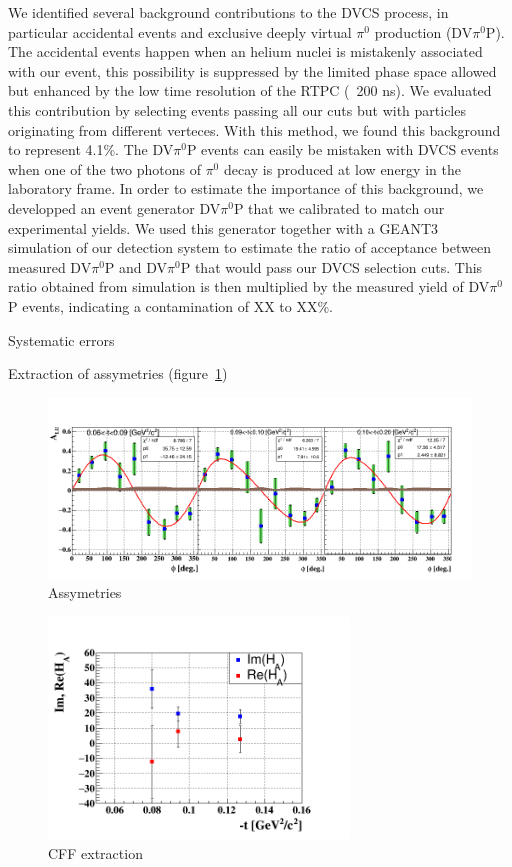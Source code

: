 \documentclass[%
 reprint,
 amsmath,amssymb,
 aps,
]{revtex4-1}
\begin{document}
We identified several background contributions to the DVCS process, in 
particular accidental events and exclusive deeply virtual $\pi^0$ production (DV$\pi^0$P). The accidental
events happen when an helium nuclei is mistakenly associated with our event, this 
possibility is suppressed by the limited phase space allowed but enhanced by the
low time resolution of the RTPC (~200 ns). We evaluated this contribution by
selecting events passing all our cuts but with particles originating from 
different verteces. With this method, we found this background to represent 
4.1\%. The DV$\pi^0$P events can easily be mistaken
with DVCS events when one of the two photons of $\pi^0$ decay is produced at
low energy in the laboratory frame. In order to estimate the importance of
this background, we developped an event generator DV$\pi^0$P 
that we calibrated to match our experimental yields. We used this generator together 
with a GEANT3~\cite{} simulation of our detection system to estimate the ratio 
of acceptance between measured DV$\pi^0$P and DV$\pi^0$P that would pass our 
DVCS selection cuts. This ratio obtained from simulation is then multiplied by 
the measured yield of DV$\pi^0$P events, indicating a contamination of XX to XX\%. 

Systematic errors


Extraction of assymetries (figure~\ref{fig:assym})

\begin{figure}[htbp]
\caption{\label{fig:assym} Assymetries}
\includegraphics[width=14cm]{coh_alu_t_phi.png}
\end{figure}


\begin{figure}[htbp]
\caption{\label{fig:CFF} CFF extraction}
\includegraphics[width=8cm]{HA_t.png}
\end{figure}
\end{document}
